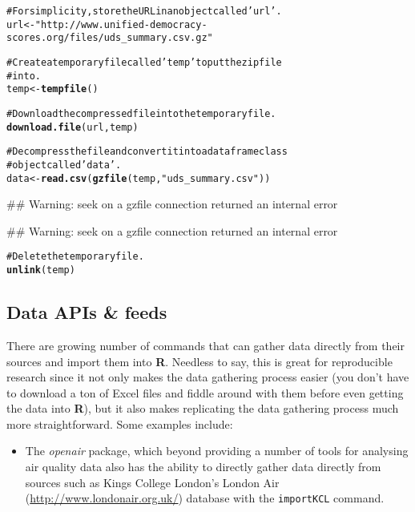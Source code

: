 \documentclass[ChapterTOCs,krantz1]{krantz}\usepackage{graphicx, color}
\makeatletter
\newcommand{\hlfunctioncall}[1]{\textcolor[rgb]{0.501960784313725,0,0.329411764705882}{\textbf{#1}}}%
\newcommand{\hlstring}[1]{\textcolor[rgb]{0.6,0.6,1}{#1}}%
\newcommand{\hlcomment}[1]{\textcolor[rgb]{0.180392156862745,0.6,0.341176470588235}{#1}}%
\newenvironment{kframe}{%
 \def\at@end@of@kframe{}%
 \ifinner\ifhmode%
  \def\at@end@of@kframe{\end{minipage}}%
  \begin{minipage}{\columnwidth}%
 \fi\fi%
 \def\FrameCommand##1{\hskip\@totalleftmargin \hskip-\fboxsep
 \colorbox{shadecolor}{##1}\hskip-\fboxsep
     \hskip-\linewidth \hskip-\@totalleftmargin \hskip\columnwidth}%
 \MakeFramed {\advance\hsize-\width
   \@totalleftmargin\z@ \linewidth\hsize
   \@setminipage}}%
 {\par\unskip\endMakeFramed%
 \at@end@of@kframe}
\newenvironment{knitrout}{}{} %
\makeatother
\begin{document}
\begin{knitrout}
\color{fgcolor}\begin{kframe}
\begin{alltt}
\hlcomment{# For simplicity, store the URL in an object called \hlstring{'url'}.}
url <- \hlstring{"http://www.unified-democracy-scores.org/files/uds_summary.csv.gz"}

\hlcomment{# Create a temporary file called \hlstring{'temp'} to put the zip file}
\hlcomment{# into.}
temp <- \hlfunctioncall{tempfile}()

\hlcomment{# Download the compressed file into the temporary file.}
\hlfunctioncall{download.file}(url, temp)

\hlcomment{# Decompress the file and convert it into a dataframe class}
\hlcomment{# object called \hlstring{'data'}.}
data <- \hlfunctioncall{read.csv}(\hlfunctioncall{gzfile}(temp, \hlstring{"uds_summary.csv"}))
\end{alltt}


{\ttfamily\noindent\textcolor{warningcolor}{\#\# Warning: seek on a gzfile connection returned an internal error}}

{\ttfamily\noindent\textcolor{warningcolor}{\#\# Warning: seek on a gzfile connection returned an internal error}}\begin{alltt}

\hlcomment{# Delete the temporary file.}
\hlfunctioncall{unlink}(temp)
\end{alltt}
\end{kframe}
\end{knitrout}


\subsection{Data APIs \& feeds}

There are growing number of commands that can gather data directly from
their sources and import them into \textbf{R}. Needless to say, this is
great for reproducible research since it not only makes the data
gathering process easier (you don't have to download a ton of Excel
files and fiddle around with them before even getting the data into
\textbf{R}), but it also makes replicating the data gathering process
much more straightforward. Some examples include:

\begin{itemize}
    \item The \emph{openair} package, which beyond providing a number of tools for analysing air quality data also has the ability to directly gather data directly from sources such as Kings College London's London Air (\url{http://www.londonair.org.uk/}) database with the \texttt{importKCL} command.
\end{itemize}
\end{document}
